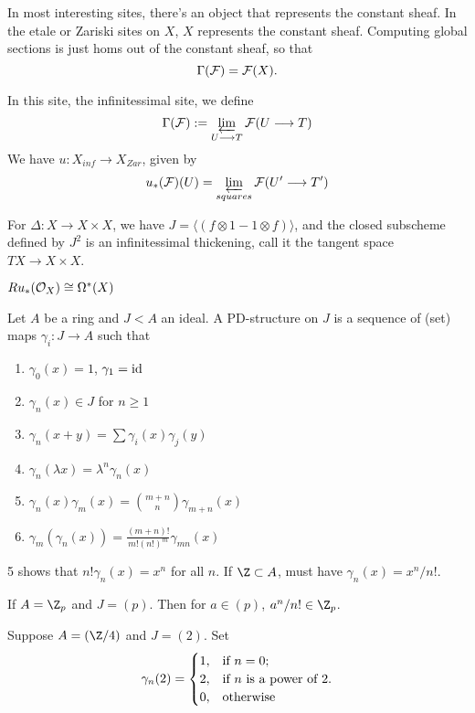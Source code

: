 \begin{SaulCrystallineCohomology}
In most interesting sites, there's an object that represents the constant sheaf. In the etale or Zariski sites on $X$, $X$ represents the constant sheaf. Computing global sections is just homs out of the constant sheaf, so that
\[\Gamma(\mathcal{F})=\mathcal{F}(X).\]

In this site, the infinitessimal site, we define
\[\Gamma(\mathcal{F}):=\varprojlim_{U\longrightarrow T}\mathcal{F}(U\longrightarrow T)\]
We have $u:X_{inf}\to X_{Zar}$, given by
\[u_*(\mathcal{F})(U)=\varprojlim_{squares}\mathcal{F}(U'\longrightarrow T')\]

\begin{exmp*}
For $\Delta:X\to X\times X$, we have $J=\langle (f\otimes1-1\otimes f)\rangle$, and the closed subscheme defined by $J^2$ is an infinitessimal thickening, call it the tangent space $TX\to X\times X$.
\end{exmp*}
\begin{prop*}
$Ru_*(\mathcal{O}_X)\cong\Omega^*(X)$
\end{prop*}
\begin{defn*}
Let $A$ be a ring and $J< A$ an ideal. A PD-structure on $J$ is a sequence of (set) maps $\gamma_i:J\to A$ such that
\begin{enumerate}\squishlist
\item $\gamma_0(x)=1$, $\gamma_1=\textup{id}$
\item $\gamma_n(x)\in J$ for $n\geq1$
\item $\gamma_n(x+y)=\sum \gamma_i(x)\gamma_j(y)$
\item $\gamma_n(\lambda x)=\lambda^n\gamma_n(x)$
\item $\gamma_n(x)\gamma_m(x)={m+n\choose n}\gamma_{m+n}(x)$
\item $\gamma_m(\gamma_n(x))=\frac{(m+n)!}{m!(n!)^m}\gamma_{mn}(x)$
\end{enumerate}
\end{defn*}
\begin{exmp*}
5 shows that $n!\gamma_n(x)=x^n$ for all $n$. If $\Z\subset A$, must have $\gamma_n(x)=x^n/n!$.
\end{exmp*}
\begin{exmp*}
If $A=\Z_p$ and $J=(p)$. Then for $a\in(p)$, $a^n/n!\in\Z_p$.
\end{exmp*}
\begin{exmp*}
Suppose $A=(\Z/4)$ and $J=(2)$. Set
\[\gamma_n(2)=\begin{cases}
1,&\textup{if }n=0;\\
2,&\textup{if }n\textup{ is a power of 2}.
\\0,&\textup{otherwise}

\end{cases}\]
\end{exmp*}
\end{SaulCrystallineCohomology}
